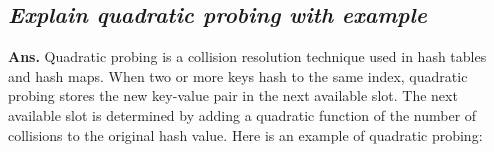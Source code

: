 \documentclass{article}
\begin{document}
\subsection{\textit{Explain quadratic probing with example}}
\textbf{Ans.} Quadratic probing is a collision resolution technique used in hash tables and hash maps. When two or more keys hash to the same index, quadratic probing stores the new key-value pair in the next available slot. The next available slot is determined by adding a quadratic function of the number of collisions to the original hash value. Here is an example of quadratic probing:\\
\end{document}
